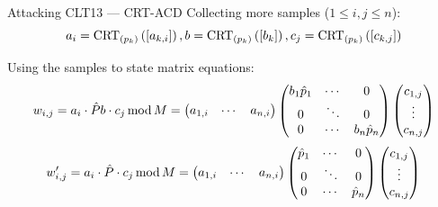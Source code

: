\documentclass[english]{beamer}
\begin{document}
    \begin{frame}{Attacking CLT13 --- CRT-ACD}
        Collecting more samples ($1 \leq i,j \leq n$):
        \begin{equation*}
            a_i = \crtp[k]{a_{k, i}}, b = \crtp[k]{b_k}, c_j = \crtp[k]{c_{k, j}}
        \end{equation*}

        Using the samples to state matrix equations:
        \begin{equation*}
            w_{i,j} = a_i \cdot \hat{P} b \cdot c_j \smod M =
            \begin{pmatrix}
                a_{1, i} & \cdots & a_{n, i}
            \end{pmatrix}
            \begin{pmatrix}
                b_1 \hat{p}_1 & \cdots & 0 \\
                0 & \ddots & 0 \\
                0 & \cdots & b_n \hat{p}_n
            \end{pmatrix}
            \begin{pmatrix}
                c_{1, j} \\
                \vdots \\
                c_{n, j}
            \end{pmatrix}
        \end{equation*}
        \begin{equation*}
            w'_{i,j} = a_i \cdot \hat{P} \cdot c_j \smod M =
            \begin{pmatrix}
                a_{1, i} & \cdots & a_{n, i}
            \end{pmatrix}
            \begin{pmatrix}
                \hat{p}_1 & \cdots & 0 \\
                0 & \ddots & 0 \\
                0 & \cdots & \hat{p}_n
            \end{pmatrix}
            \begin{pmatrix}
                c_{1, j} \\
                \vdots \\
                c_{n, j}
            \end{pmatrix}
        \end{equation*}
    \end{frame}
\end{document}
